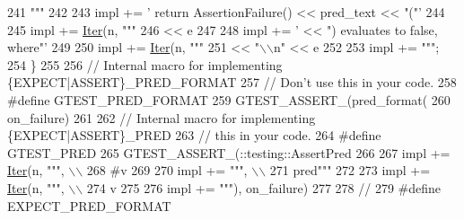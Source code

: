 \begin{DoxyCode}
{{{{{{{{241 \textcolor{stringliteral}{"""} %
242 
243   impl += \textcolor{stringliteral}{'  return AssertionFailure() << pred\_text << "("'}
244 
245   impl += \hyperlink{namespacegen__gtest__pred__impl_ac016218b7c9437d1d5ac85c574c83069}{Iter}(n, \textcolor{stringliteral}{"""}
246 \textcolor{stringliteral}{                            << e%
247 
248   impl += \textcolor{stringliteral}{' << ") evaluates to false, where"'}
249 
250   impl += \hyperlink{namespacegen__gtest__pred__impl_ac016218b7c9437d1d5ac85c574c83069}{Iter}(n, \textcolor{stringliteral}{"""}
251 \textcolor{stringliteral}{                            << "\(\backslash\)\(\backslash\)n" << e%
252 
253   impl += \textcolor{stringliteral}{""";}
254 \textcolor{stringliteral}{\}}
255 \textcolor{stringliteral}{}
256 \textcolor{stringliteral}{// Internal macro for implementing \{EXPECT|ASSERT\}\_PRED\_FORMAT%
257 \textcolor{stringliteral}{// Don't use this in your code.}
258 \textcolor{stringliteral}{#define GTEST\_PRED\_FORMAT%
259 \textcolor{stringliteral}{  GTEST\_ASSERT\_(pred\_format(%
260 \textcolor{stringliteral}{                on\_failure)}
261 \textcolor{stringliteral}{}
262 \textcolor{stringliteral}{// Internal macro for implementing \{EXPECT|ASSERT\}\_PRED%
263 \textcolor{stringliteral}{// this in your code.}
264 \textcolor{stringliteral}{#define GTEST\_PRED%
265 \textcolor{stringliteral}{  GTEST\_ASSERT\_(::testing::AssertPred%
266 
267   impl += \hyperlink{namespacegen__gtest__pred__impl_ac016218b7c9437d1d5ac85c574c83069}{Iter}(n, \textcolor{stringliteral}{""", \(\backslash\)\(\backslash\)}
268 \textcolor{stringliteral}{                                             #v%
269 
270   impl += \textcolor{stringliteral}{""", \(\backslash\)\(\backslash\)}
271 \textcolor{stringliteral}{                                             pred"""}
272 
273   impl += \hyperlink{namespacegen__gtest__pred__impl_ac016218b7c9437d1d5ac85c574c83069}{Iter}(n, \textcolor{stringliteral}{""", \(\backslash\)\(\backslash\)}
274 \textcolor{stringliteral}{                                             v%
275 
276   impl += \textcolor{stringliteral}{"""), on\_failure)}
277 \textcolor{stringliteral}{}
278 \textcolor{stringliteral}{// %
279 \textcolor{stringliteral}{#define EXPECT\_PRED\_FORMAT%
}}}}}}}}}}}}}}}}}}}}
\end{DoxyCode}
